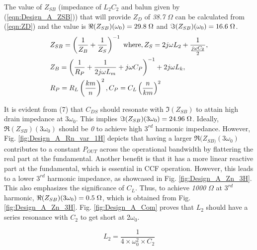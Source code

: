 \documentclass[conference]{IEEEtran}
\begin{document}
The value of $Z_{SB}$ (impedance of $L_2C_2$ and balun given by (\ref{eqn:Design_A_ZSB})) that will provide $Z_D$ of \textit{38.7} $\Omega$ can be calculated from (\ref{eqn:ZD}) and the value is $\Re(Z_{SB})(\omega_0) =  29.8\hspace{1mm} \Omega$ and $\Im(Z_{SB})(\omega_0) = 16.6\hspace{1mm}\Omega$.
\vspace{-0.05in}
\begin{equation}
\begin{aligned}
    &Z_{SB}=\left(\frac{1}{Z_B}+\frac{1}{Z_S}\right)^{-1}
    \hspace{1mm}\text{where}, Z_S=2j\omega  L_2+\frac{1}{\frac{j \omega C_2}{2}}, \\
    &Z_B=\left(\frac{1}{R_P}+\frac{1}{2j \omega  L_m}+j \omega C_P\right)^{-1}+2j \omega  L_k,\\ &R_P=R_L\left(\frac{km}{n}\right)^2,C_P=C_L\left(\frac{n}{km}\right)^2
\label{eqn:Design_A_ZSB}
\end{aligned}
\end{equation}

It is evident from (7) that $C_{DS}$ should resonate with $\Im(Z_{SB})$ to attain high drain impedance at $3\omega_0$. This implies $\Im(Z_{SB})(3\omega_0) = 24.96\hspace{1mm}\Omega$. Ideally, $\Re(Z_{SB})(3\omega_0)$ should be \textit{0} to achieve high $3^{rd}$ harmonic impedance. However, Fig. \ref{fig:Design_A_Rn_var_1H} depicts that having a larger $\Re(Z_{SB)}(3\omega_0)$ contributes to a constant $P_{OUT}$ across the operational bandwidth by flattering the real part at the fundamental. Another benefit is that it has a  more linear reactive part at the fundamental, which is essential in CCF operation.
However, this leads to a lower $3^{rd}$ harmonic impedance, as showcased in Fig. \ref{fig:Design_A_Zn_3H}. This also emphasizes  the significance of $C_L$. Thus, to achieve \textit{1000} $\Omega$ at $3^{rd}$ harmonic,  $\Re(Z_{SB})(3\omega_0) = 0.5\hspace{1mm}\Omega$, which is obtained from Fig. \ref{fig:Design_A_Zn_3H}. Fig. \ref{fig:Design_A_Com} proves that $L_2$ should have a series resonance with $C_2$ to get short at 2$\omega_0$.

\vspace{-0.05in}
\begin{equation}
    L_2=\frac{1}{4\times\omega_0^2\times C_2}%
    \label{eqn:Design_A_2H}
\end{equation}
\end{document}
